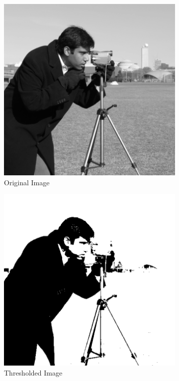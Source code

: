 \documentclass{standalone}
\begin{document}
\begin{figure}[h!]
		\centering
        \begin{subfigure}[b]{0.325\textwidth}
             \includegraphics[scale=0.38]{img/Chap1/THR_original.png}
             \caption{Original Image}
        \end{subfigure}
        \hfill
        \begin{subfigure}[b]{0.325\textwidth}
             \includegraphics[scale=0.38]{img/Chap1/THR_thresholded.png}
             \caption{Thresholded Image}
        \end{subfigure}
        \hfill
        \begin{subfigure}[b]{0.325\textwidth}

\end{subfigure}
\end{figure}
\end{document}
